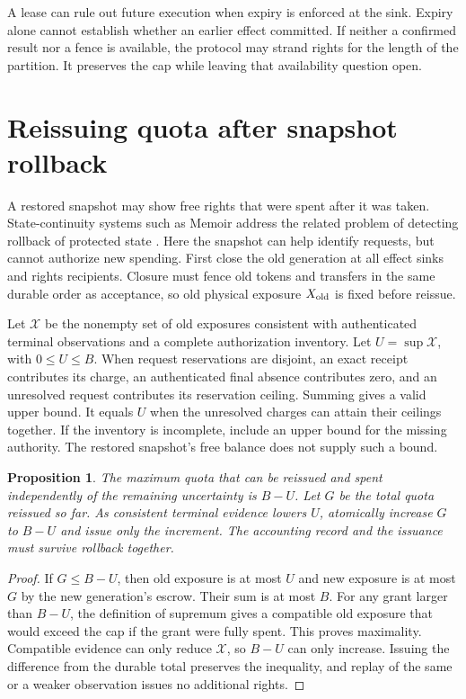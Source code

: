 \documentclass[11pt]{article}
\newtheorem{proposition}{Proposition}
\begin{document}
A lease can rule out future execution when expiry is enforced
at the sink. Expiry alone cannot establish whether an earlier
effect committed. If neither a confirmed result nor a fence is
available, the protocol may strand rights for the length of the
partition. It preserves the cap while leaving that availability
question open.

\section{Reissuing quota after snapshot rollback}
A restored snapshot may show free rights that were spent after
it was taken. State-continuity systems such as Memoir address
the related problem of detecting rollback of protected state
\cite{memoir}. Here the snapshot can help identify requests,
but cannot authorize new spending. First close the old generation
at all effect sinks and rights recipients. Closure must fence old
tokens and transfers in the same durable order as acceptance,
so old physical exposure $X_{\rm old}$ is fixed before reissue.

Let $\mathcal X$ be the nonempty set of old exposures consistent
with authenticated terminal observations and a complete
authorization inventory. Let $U=\sup\mathcal X$, with
$0\le U\le B$. When request reservations are disjoint, an
exact receipt contributes its charge, an authenticated final
absence contributes zero, and an unresolved request contributes
its reservation ceiling. Summing gives a valid upper bound.
It equals $U$ when the unresolved charges can attain their
ceilings together. If the inventory is incomplete, include an
upper bound for the missing authority. The restored snapshot's
free balance does not supply such a bound.

\begin{proposition}
The maximum quota that can be reissued and spent independently
of the remaining uncertainty is $B-U$. Let $G$ be the total
quota reissued so far. As consistent terminal evidence lowers
$U$, atomically increase $G$ to $B-U$ and issue only the
increment. The accounting record and the issuance must survive
rollback together.
\end{proposition}
\begin{proof}
If $G\le B-U$, then old exposure is at most $U$ and new
exposure is at most $G$ by the new generation's escrow. Their
sum is at most $B$. For any grant larger than $B-U$, the
definition of supremum gives a compatible old exposure that
would exceed the cap if the grant were fully spent. This proves
maximality. Compatible evidence can only reduce $\mathcal X$,
so $B-U$ can only increase. Issuing the difference from the
durable total preserves the inequality, and replay of the same
or a weaker observation issues no additional rights.
\end{proof}
\end{document}
